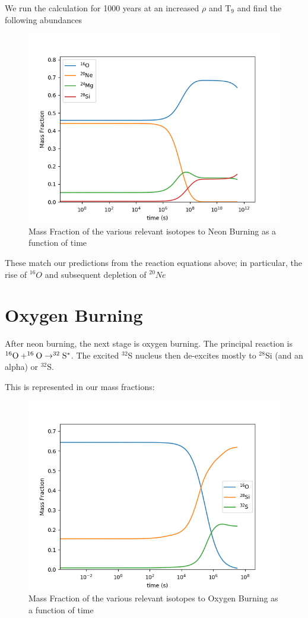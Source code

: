 \documentclass[manuscript]{aastex62}
\begin{document}
We run the calculation for 1000 years at an increased $\rho$ and T$_9$
and find the following abundances

\begin{figure}[H]
\centering
\includegraphics[scale=0.7]{task5}
\caption{Mass Fraction of the various relevant isotopes to Neon Burning as a function of time}
\end{figure}


These match our predictions from the reaction equations above; in particular, the rise of $^{16}O$  and subsequent depletion of $^{20}Ne$ 

\section{Oxygen Burning} \label{sec:O}

After neon burning, the next stage is oxygen burning.  The principal reaction
is $^{16}{\rm O} + ^{16}{\rm O} \to ^{32}{\rm S}^*$.  The excited $^{32}$S
nucleus then de-excites mostly to $^{28}$Si (and an alpha)
or $^{32}$S.

This is represented in our mass fractions:

\begin{figure}[H]
\centering
\includegraphics[scale=0.7]{task6}
\caption{Mass Fraction of the various relevant isotopes to Oxygen Burning as a function of time}
\end{figure}
\end{document}
